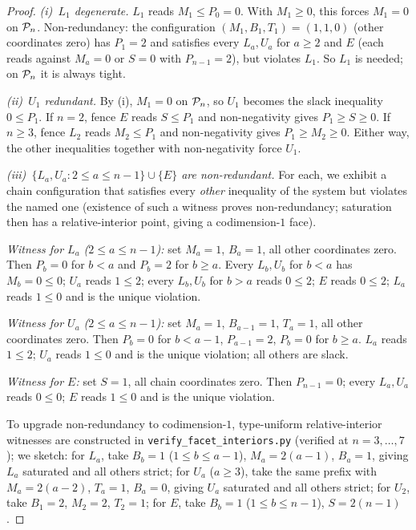 \begin{proof}
\emph{(i)~$L_1$ degenerate.} $L_1$ reads $M_1 \le P_0 = 0$. With $M_1 \ge 0$,
this forces $M_1 = 0$ on $\mathcal{P}_n$. Non-redundancy: the configuration
$(M_1, B_1, T_1) = (1, 1, 0)$ (other coordinates zero) has $P_1 = 2$ and
satisfies every $L_a, U_a$ for $a \ge 2$ and $E$ (each reads against $M_a = 0$
or $S = 0$ with $P_{n-1} = 2$), but violates $L_1$. So $L_1$ is needed; on
$\mathcal{P}_n$ it is always tight.

\emph{(ii)~$U_1$ redundant.} By (i), $M_1 = 0$ on $\mathcal{P}_n$, so $U_1$ becomes the
slack inequality $0 \le P_1$. If $n = 2$, fence $E$ reads $S \le P_1$ and
non-negativity gives $P_1 \ge S \ge 0$. If $n \ge 3$, fence $L_2$ reads
$M_2 \le P_1$ and non-negativity gives $P_1 \ge M_2 \ge 0$. Either way, the
other inequalities together with non-negativity force $U_1$.

\emph{(iii)~$\{L_a, U_a : 2 \le a \le n-1\} \cup \{E\}$ are non-redundant.} For
each, we exhibit a chain configuration that satisfies every \emph{other}
inequality of the system but violates the named one (existence of such a witness
proves non-redundancy; saturation then has a relative-interior point, giving a
codimension-$1$ face).

\smallskip
\noindent\textit{Witness for $L_a$ ($2 \le a \le n-1$):} set $M_a = 1$,
$B_a = 1$, all other coordinates zero. Then $P_b = 0$ for $b < a$ and $P_b = 2$
for $b \ge a$. Every $L_b, U_b$ for $b < a$ has $M_b = 0 \le 0$; $U_a$ reads
$1 \le 2$; every $L_b, U_b$ for $b > a$ reads $0 \le 2$; $E$ reads $0 \le 2$;
$L_a$ reads $1 \le 0$ and is the unique violation.

\smallskip
\noindent\textit{Witness for $U_a$ ($2 \le a \le n-1$):} set $M_a = 1$,
$B_{a-1} = 1$, $T_a = 1$, all other coordinates zero. Then $P_b = 0$ for
$b < a-1$, $P_{a-1} = 2$, $P_b = 0$ for $b \ge a$. $L_a$ reads $1 \le 2$;
$U_a$ reads $1 \le 0$ and is the unique violation; all others are slack.

\smallskip
\noindent\textit{Witness for $E$:} set $S = 1$, all chain coordinates zero. Then
$P_{n-1} = 0$; every $L_a, U_a$ reads $0 \le 0$; $E$ reads $1 \le 0$ and is the
unique violation.

\smallskip
\noindent To upgrade non-redundancy to codimension-$1$, type-uniform
relative-interior witnesses are constructed in
\texttt{verify\_facet\_interiors.py} (verified at $n = 3, \dots, 7$); we sketch:
for $L_a$, take $B_b = 1$ ($1 \le b \le a-1$), $M_a = 2(a-1)$, $B_a = 1$, giving
$L_a$ saturated and all others strict; for $U_a$ ($a \ge 3$), take the same
prefix with $M_a = 2(a-2)$, $T_a = 1$, $B_a = 0$, giving $U_a$ saturated and all
others strict; for $U_2$, take $B_1 = 2$, $M_2 = 2$, $T_2 = 1$; for $E$, take
$B_b = 1$ ($1 \le b \le n-1$), $S = 2(n-1)$.
\end{proof}

